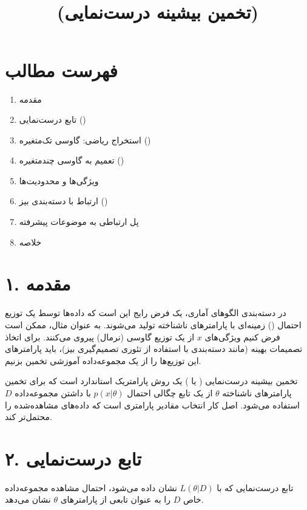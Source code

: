 \documentclass{article}
\title{\lr{Maximum Likelihood Estimation (MLE)} \\ (تخمین بیشینه درست‌نمایی)}
\author{}
\date{}
\begin{document}
\maketitle

\section*{فهرست مطالب}
\begin{enumerate}
    \item مقدمه
    \item تابع درست‌نمایی ()
    \item استخراج ریاضی: گاوسی تک‌متغیره ()
    \item تعمیم به گاوسی چندمتغیره ()
    \item ویژگی‌ها و محدودیت‌ها
    \item ارتباط با دسته‌بندی بیز ()
    \item پل ارتباطی به موضوعات پیشرفته
    \item خلاصه
\end{enumerate}

\newpage

\section*{۱. مقدمه}
در دسته‌بندی الگوهای آماری، یک فرض رایج این است که داده‌ها توسط یک توزیع احتمال () زمینه‌ای با پارامترهای ناشناخته تولید می‌شوند. به عنوان مثال، ممکن است فرض کنیم ویژگی‌های $x$ از یک توزیع گاوسی (نرمال) پیروی می‌کنند. برای اتخاذ تصمیمات بهینه (مانند دسته‌بندی با استفاده از تئوری تصمیم‌گیری بیز)، باید پارامترهای این توزیع‌ها را از یک مجموعه‌داده آموزشی تخمین بزنیم.

تخمین بیشینه درست‌نمایی ( یا ) یک روش پارامتریک استاندارد است که برای تخمین پارامترهای ناشناخته $\theta$ از یک تابع چگالی احتمال $p(x|\theta)$ با داشتن مجموعه‌داده $D$ استفاده می‌شود. اصل کار انتخاب مقادیر پارامتری است که داده‌های مشاهده‌شده را محتمل‌تر کند.

\section*{۲. تابع درست‌نمایی}
تابع درست‌نمایی که با $L(\theta|D)$ نشان داده می‌شود، احتمال مشاهده مجموعه‌داده خاص $D$ را به عنوان تابعی از پارامترهای $\theta$ نشان می‌دهد.
\end{document}
